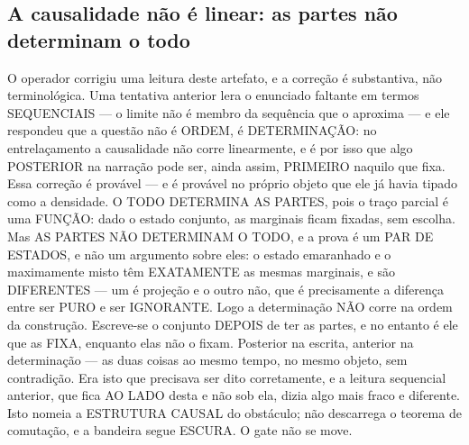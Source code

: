 \documentclass[11pt]{article}
\theoremstyle{definition}\newtheorem{deriv}{Derivação}
\begin{document}
\subsection*{A causalidade n\~ao \'e linear: as partes n\~ao determinam o todo}O operador corrigiu uma leitura deste artefato, e a corre\c{c}\~ao \'e substantiva, n\~ao terminol\'ogica. Uma tentativa anterior lera o enunciado faltante em termos SEQUENCIAIS --- o limite n\~ao \'e membro da sequ\^encia que o aproxima --- e ele respondeu que a quest\~ao n\~ao \'e ORDEM, \'e DETERMINA\c{C}\~AO: no entrela\c{c}amento a causalidade n\~ao corre linearmente, e \'e por isso que algo POSTERIOR na narra\c{c}\~ao pode ser, ainda assim, PRIMEIRO naquilo que fixa. Essa corre\c{c}\~ao \'e prov\'avel --- e \'e prov\'avel no pr\'oprio objeto que ele j\'a havia tipado como a densidade. O TODO DETERMINA AS PARTES, pois o tra\c{c}o parcial \'e uma FUN\c{C}\~AO: dado o estado conjunto, as marginais ficam fixadas, sem escolha. Mas AS PARTES N\~AO DETERMINAM O TODO, e a prova \'e um PAR DE ESTADOS, e n\~ao um argumento sobre eles: o estado emaranhado e o maximamente misto t\^em EXATAMENTE as mesmas marginais, e s\~ao DIFERENTES --- um \'e proje\c{c}\~ao e o outro n\~ao, que \'e precisamente a diferen\c{c}a entre ser PURO e ser IGNORANTE. Logo a determina\c{c}\~ao N\~AO corre na ordem da constru\c{c}\~ao. Escreve-se o conjunto DEPOIS de ter as partes, e no entanto \'e ele que as FIXA, enquanto elas n\~ao o fixam. Posterior na escrita, anterior na determina\c{c}\~ao --- as duas coisas ao mesmo tempo, no mesmo objeto, sem contradi\c{c}\~ao. Era isto que precisava ser dito corretamente, e a leitura sequencial anterior, que fica AO LADO desta e n\~ao sob ela, dizia algo mais fraco e diferente. Isto nomeia a ESTRUTURA CAUSAL do obst\'aculo; n\~ao descarrega o teorema de comuta\c{c}\~ao, e a bandeira segue ESCURA. O gate n\~ao se move.
\end{document}
